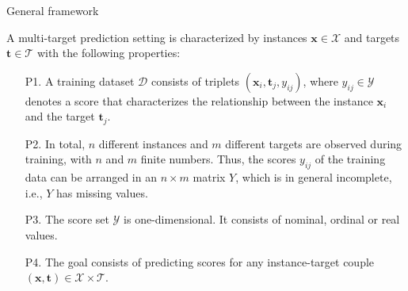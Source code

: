 \documentclass[]{beamer}
\renewcommand{\vec}[1]{\boldsymbol{#1}}
\begin{document}


\begin{frame}{General framework}
\begin{definition}
A multi-target prediction setting is characterized by instances $\vec{x} \in \mathcal{X}$ and targets $\vec{t} \in \mathcal{T}$ with the following properties: 
\begin{itemize} 
\item[P1.] A training dataset $\mathcal{D}$ consists of triplets $(\vec{x}_i,\vec{t}_j,y_{ij})$, where $y_{ij} \in \mathcal{Y}$ denotes a score that characterizes the relationship between the instance $\vec{x}_i$ and the target $\vec{t}_j$.  
\item[P2.] In total, $n$ different instances and $m$ different targets are observed during training, with $n$ and $m$ finite numbers. Thus, the scores $y_{ij}$ of the training data can be arranged in an $n \times m$ matrix $Y$, which is in general incomplete, i.e., $Y$ has missing values.
\item[P3.] The score set $\mathcal{Y}$ is one-dimensional. It consists of nominal, ordinal or real values.  
\item[P4.] The goal consists of predicting scores for any instance-target couple $(\vec{x},\vec{t}) \in \mathcal{X} \times \mathcal{T}$.   
\end{itemize}
\end{definition}

\end{frame}
\end{document}
